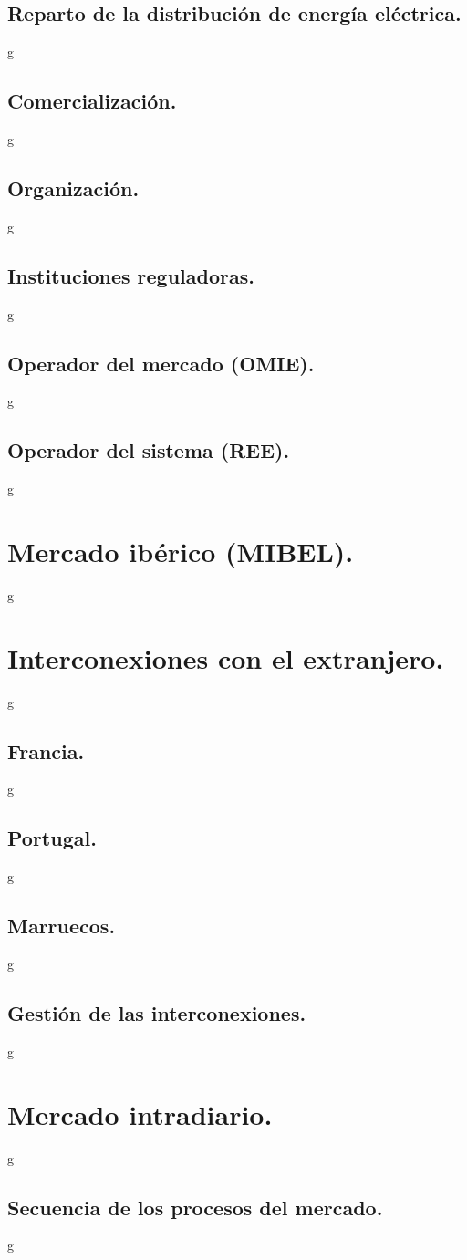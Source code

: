 \subsection{Reparto de la distribución de energía eléctrica.}
g
\subsection{Comercialización.}
g
\subsection{Organización.}
g
\subsection{Instituciones reguladoras.}
g
\subsection{Operador del mercado (OMIE).}
g
\subsection{Operador del sistema (REE).}
g
\section{Mercado ibérico (MIBEL).}
g
\section{Interconexiones con el extranjero.}
g
\subsection{Francia.}
g
\subsection{Portugal.}
g
\subsection{Marruecos.}
g
\subsection{Gestión de las interconexiones.}
g
\section{Mercado intradiario.}
g
\subsection{Secuencia de los procesos del mercado.}
g
